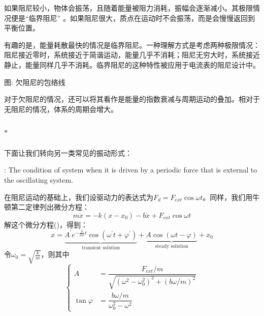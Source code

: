 如果阻尼较小，物体会振荡，且随着能量被阻力消耗，振幅会逐渐减小。其极限情况便是“临界阻尼” 。如果阻尼很大，质点在运动时不会振荡，而是会慢慢返回到平衡位置。

有趣的是，能量耗散最快的情况是临界阻尼。一种理解方式是考虑两种极限情况：阻尼接近零时，系统接近于简谐运动，能量几乎不消耗；阻尼无穷大时，系统接近静止，能量同样几乎不消耗。临界阻尼的这种特性被应用于电流表的阻尼设计中。

\begin{center}
    \par
    图\thefigure: 欠阻尼的包络线
\end{center}

对于欠阻尼的情况，还可以将其看作是能量的指数衰减与周期运动的叠加。相对于无阻尼的情况，体系的周期会增大。
\subsection[受迫振动$^*$]{$^*$}
下面让我们转向另一类常见的振动形式：
\begin{Itemize}
    \item {}: The condition of system when it is driven by a periodic force that is external to the oscillating system.
\end{Itemize}

在阻尼运动的基础上，我们设驱动力的表达式为$F_d=F_{ext}\cos \omega t$。同样，我们用牛顿第二定律列出微分方程：
\[m\ddot{x}=-k(x-x_0)-b\dot{x}+F_{ext}\cos \omega t\]
解这个微分方程()，得到：
\[x=\underbrace{A^{\prime}e^{-\frac{b}{2m}t}\cos(\omega^{\prime}t+\varphi^{\prime})}_{\text{transient solution}}+\underbrace{A\cos(\omega t-\varphi)}_{\text{steady solution}}+x_0\]
令$\omega_0=\sqrt{\frac{k}{m}}$，则其中
\[
    \left\{
    \begin{aligned}
        A            & =\dfrac{F_{ext}/m}{\sqrt{(\omega^2-\omega_0^2)^2+(b\omega/m)^2}} \\
        \tan \varphi & =\dfrac{b\omega/m}{\omega_0^2-\omega^2}
    \end{aligned}
    \right.
\]


